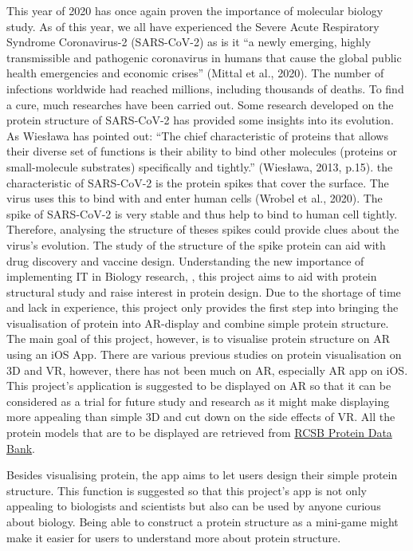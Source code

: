 This year of 2020 has once again proven the importance of molecular biology study. As of this year, we all have experienced the Severe Acute Respiratory Syndrome Coronavirus-2 (SARS-CoV-2) as is it “a newly emerging, highly transmissible and pathogenic coronavirus in humans that cause the global public health emergencies and economic crises” (Mittal et al., 2020). The number of infections worldwide had reached millions, including thousands of deaths. To find a cure, much researches have been carried out. Some research developed on the protein structure of SARS-CoV-2 has provided some insights into its evolution. As Wiesława has pointed out: “The chief characteristic of proteins that allows their diverse set of functions is their ability to bind other molecules (proteins or small-molecule substrates) specifically and tightly.” (Wiesława, 2013, p.15). the characteristic of SARS-CoV-2 is the protein spikes that cover the surface. The virus uses this to bind with and enter human cells (Wrobel et al., 2020). The spike of SARS-CoV-2 is very stable and thus help to bind to human cell tightly. Therefore, analysing the structure of theses spikes could provide clues about the virus’s evolution. The study of the structure of the spike protein can aid with drug discovery and vaccine design. 
Understanding the new importance of implementing IT in Biology research, , this project aims to aid with protein structural study and raise interest in protein design.
Due to the shortage of time and lack in experience, this project only provides the first step into bringing the visualisation of protein into AR-display and combine simple protein structure. The main goal of this project, however, is to visualise protein structure on AR using an iOS App. 
There are various previous studies on protein visualisation on 3D and VR, however, there has not been much on AR, especially AR app on iOS. This project's application is suggested to be displayed on AR so that it can be considered as a trial for future study and research as it might make displaying more appealing than simple 3D and cut down on the side effects of VR. All the protein models that are to be displayed are retrieved from \href{https://www.rcsb.org/}{RCSB Protein Data Bank}. 

Besides visualising protein, the app aims to let users design their simple protein structure. This function is suggested so that this project's app is not only appealing to biologists and scientists but also can be used by anyone curious about biology. Being able to construct a protein structure as a mini-game might make it easier for users to understand more about protein structure. 

